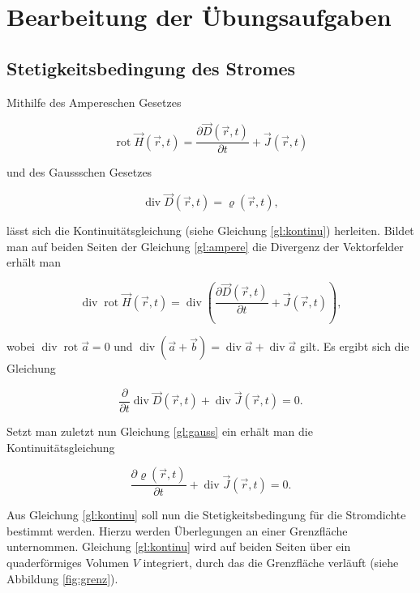 \chapter{Bearbeitung der Übungsaufgaben}
\section{Stetigkeitsbedingung des Stromes}
Mithilfe des Ampereschen Gesetzes

\begin{equation}
\label{gl:ampere}
\operatorname{rot} \vec{H}(\vec{r},t) = \frac{\partial\vec{D}(\vec{r},t)}{\partial t}
+ \vec{J}(\vec{r},t)
\end{equation} 

und des Gaussschen Gesetzes

\begin{equation}
\label{gl:gauss}
\operatorname{div} \vec{D}(\vec{r},t) = \varrho (\vec{r},t),
\end{equation}

lässt sich die Kontinuitätsgleichung (siehe Gleichung \ref{gl:kontinu}) herleiten.
Bildet man auf beiden Seiten der Gleichung \ref{gl:ampere} die Divergenz der Vektorfelder erhält man

\begin{equation*}
\operatorname{div} \operatorname{rot} \vec{H}(\vec{r},t) = \operatorname{div} \left( \frac{\partial\vec{D}(\vec{r},t)}{\partial t} + \vec{J}(\vec{r},t) \right),
\end{equation*} 

wobei $\operatorname{div} \operatorname{rot} \vec{a} = 0$ und $\operatorname{div} (\vec{a}+\vec{b}) = \operatorname{div} \vec{a} + \operatorname{div} \vec{a}$ gilt. Es ergibt sich die Gleichung

\begin{equation*}
\frac{\partial}{\partial t}\operatorname{div}\vec{D}(\vec{r},t) + \operatorname{div}\vec{J}(\vec{r},t) = 0.
\end{equation*}

Setzt man zuletzt nun Gleichung \ref{gl:gauss} ein erhält man die Kontinuitätsgleichung

\begin{equation}
\label{gl:kontinu}
\frac{\partial \varrho (\vec{r},t)}{\partial t} + \operatorname{div}\vec{J}(\vec{r},t) = 0.
\end{equation}

Aus Gleichung \ref{gl:kontinu} soll nun die Stetigkeitsbedingung für die Stromdichte bestimmt werden. Hierzu werden Überlegungen an einer Grenzfläche unternommen. Gleichung \ref{gl:kontinu} wird auf beiden Seiten über ein quaderförmiges  Volumen $V$ integriert, durch das die Grenzfläche verläuft (siehe Abbildung \ref{fig:grenz}).

